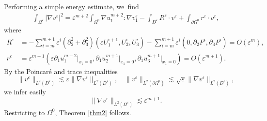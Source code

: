 \documentclass[JEP,XML,SOM,Unicode,NoEqCountersInSection,published]{cedram}
\theoremstyle{plain}
\theoremstyle{definition}
\let\pa\partial
\let\na\nabla
\let\eps\varepsilon
\begin{document}
Performing a simple energy estimate, we~find
\begin{align*}
\int_{\Omega^\eps} |\na v^\eps|^2 = \eps^{m+2} \int_{\Omega^0} \na u_1^{m+2} : \na v_1^\eps - \int_{D^\eps} R^\eps \cdot v^\eps + \int_{\pa \Omega^0} r^\eps \cdot v^\eps,
\end{align*}
where
\begin{align*}
R^\eps & = - \sum_{i=m}^{m+1} \eps^i (\pa^2_2 + \pa^2_3) (\eps U^{i+1}_1,U^i_2,U^i_3) - \sum_{i=m}^{m+1} \eps^i (0, \pa_2 P^i, \pa_3 P^i) = O(\eps^m), \\
r^\eps & = \eps^{m+1}(\eps \pa_1 u^{m+2}_1\vert_{x_1=0},\pa_1 u^{m+1}_2\vert_{x_1=0}, \pa_1 u^{m+1}_3\vert_{x_1=0}) = O(\eps^{m+1}).
\end{align*}
By the Poincaré and trace inequalities
\[
\| v^\eps \|_{L^2(D^\eps)} \lesssim \eps \|\na v^\eps \|_{L^2(D^\eps)}, \quad \| v^\eps \|_{L^2(\pa\Omega^0)} \lesssim \sqrt{\eps} \|\na v^\eps \|_{L^2(D^\eps)},
\]
we infer easily
\[
\|\na v^\eps \|_{L^2(\Omega^\eps)} \lesssim \eps^{m+1}.
\]
Restricting to $\Omega^0$, Theorem \ref{thm2} follows.
\end{document}
